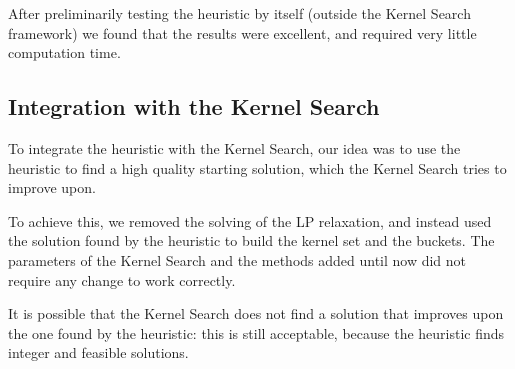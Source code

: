 After preliminarily testing the heuristic by itself (outside the Kernel Search framework)
we found that the results were excellent, and required very little computation time.

\subsection{Integration with the Kernel Search}
To integrate the heuristic with the Kernel Search, our idea was to use the heuristic
to find a high quality starting solution, which the Kernel Search tries to improve upon.

To achieve this, we removed the solving of the LP relaxation, and instead
used the solution found by the heuristic to build the kernel set and the buckets.
The parameters of the Kernel Search and the methods added until now
did not require any change to work correctly.

It is possible that the Kernel Search does not find a solution that improves
upon the one found by the heuristic: this is still acceptable, because the
heuristic finds integer and feasible solutions.


